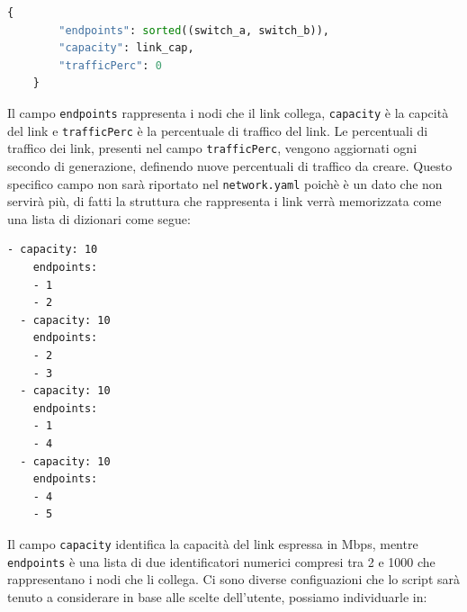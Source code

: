 \documentclass[binding=0.6cm]{sapthesis}
\begin{document}
{\scriptsize %
\begin{lstlisting}[language=Python, caption={Esempio di rappresentazione di un link}, label={codice:links_key_value}]
    {
        "endpoints": sorted((switch_a, switch_b)),
        "capacity": link_cap,
        "trafficPerc": 0
    }
\end{lstlisting}
}
Il campo \texttt{endpoints} rappresenta i nodi che il link collega, \texttt{capacity} è la capcità del link e \texttt{trafficPerc} è la percentuale di traffico del link.
Le percentuali di traffico dei link, presenti nel campo \texttt{trafficPerc}, vengono aggiornati ogni secondo di generazione, definendo nuove percentuali di traffico da creare.
Questo specifico campo non sarà riportato nel \texttt{network.yaml}
poichè è un dato che non servirà più, di fatti la struttura che rappresenta i link verrà memorizzata come una lista di dizionari come segue:


{\scriptsize %
\begin{lstlisting}[caption={Esempio di struttura finale dei links}, label={codice:links_structure}]
  - capacity: 10
    endpoints:
    - 1
    - 2
  - capacity: 10
    endpoints:
    - 2
    - 3
  - capacity: 10
    endpoints:
    - 1
    - 4
  - capacity: 10
    endpoints:
    - 4
    - 5
\end{lstlisting}
}

Il campo \texttt{capacity} identifica la capacità del link espressa in Mbps, mentre \texttt{endpoints} è una lista di due identificatori numerici compresi tra
2 e 1000 che rappresentano i nodi che li collega.
Ci sono diverse configuazioni che lo script sarà tenuto a considerare in base alle scelte dell'utente, possiamo individuarle in:
\end{document}
